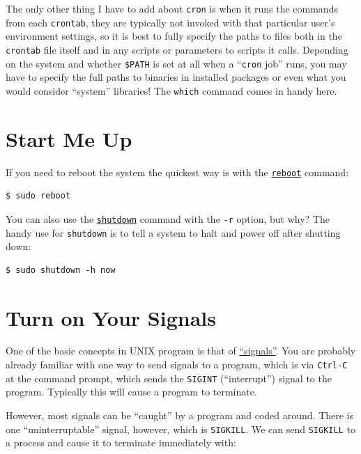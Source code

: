 \documentclass[10pt,]{book}
\numberwithin{figure}{chapter}
\begin{document}
The only other thing I have to add about \texttt{cron} is when it runs
the commands from each \texttt{crontab}, they are typically not invoked
with that particular user's environment settings, so it is best to fully
specify the paths to files both in the \texttt{crontab} file itself and
in any scripts or parameters to scripts it calls. Depending on the
system and whether \texttt{\$PATH} is set at all when a ``\texttt{cron}
job'' runs, you may have to specify the full paths to binaries in
installed packages or even what you would consider ``system'' libraries!
The \texttt{which} command comes in handy here.

\section{Start Me Up}\label{start-me-up}

If you need to reboot the system the quickest way is with the
\href{http://linux.die.net/man/8/reboot}{\texttt{reboot}} command:

\begin{verbatim}
$ sudo reboot
\end{verbatim}

You can also use the
\href{http://linux.die.net/man/8/shutdown}{\texttt{shutdown}} command
with the \texttt{-r} option, but why? The handy use for
\texttt{shutdown} is to tell a system to halt and power off after
shutting down:

\begin{verbatim}
$ sudo shutdown -h now
\end{verbatim}

\section{Turn on Your Signals}\label{turn-on-your-signals}

One of the basic concepts in UNIX program is that of
\href{https://en.wikipedia.org/wiki/Unix_signal}{``signals''}. You are
probably already familiar with one way to send signals to a program,
which is via \texttt{Ctrl-C} at the command prompt, which sends the
\texttt{SIGINT} (``interrupt'') signal to the program. Typically this
will cause a program to terminate.

However, most signals can be ``caught'' by a program and coded around.
There is one ``uninterruptable'' signal, however, which is
\texttt{SIGKILL}. We can send \texttt{SIGKILL} to a process and cause it
to terminate immediately with:
\end{document}
